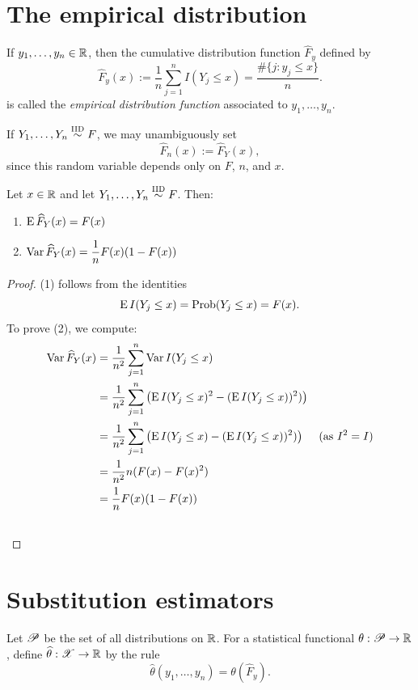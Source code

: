 \documentclass[12pt]{amsart}
\begin{document}
\section{The empirical distribution}

\begin{definition}
If $y_1,\ldots,y_n\in\mathbb{R}$,
then the cumulative distribution function $\hat F_y$ defined by
\[\hat F_y(x) := \frac1n\sum_{j=1}^n I(Y_j\leq x) = \frac{\#\{j : y_j\leq x\}}n.\]
is called the \emph{empirical distribution function}
associated to $y_1,\ldots,y_n$.
\end{definition}

If $Y_1,\ldots,Y_n\overset{\text{\textsc{IID}}}\sim F$, we may unambiguously set
\[
\hat F_n(x) := \hat F_Y(x),
\]
since this random variable depends only on $F$, $n$, and $x$.


\begin{theorem}
    Let $x\in\mathbb{R}$ and let $Y_1,\ldots,Y_n\overset{\text{\textsc{IID}}}\sim F$. Then:
    \begin{enumerate}
        \item $\operatorname{E} \widehat F_Y(x) = F(x)$
        \item $\operatorname{Var} \widehat F_Y(x) = \dfrac 1 n F(x)(1-F(x))$
    \end{enumerate}
\end{theorem}
\begin{proof}
    (1) follows from the identities
    \[\operatorname{E} I(Y_j\leq x) = \operatorname{Prob}(Y_j\leq x) = F(x).\]
    To prove (2), we compute:
    \begin{align*}
        \operatorname{Var} \widehat F_Y(x) &= \frac1{n^2} \sum_{j=1}^n \operatorname{Var} I(Y_j\leq x)\\
        &= \frac1{n^2}\sum_{j=1}^n\left(\operatorname{E} I(Y_j\leq x)^2 - (\operatorname{E} I(Y_j\leq x))^2)\right)\\
        &= \frac1{n^2}\sum_{j=1}^n\left(\operatorname{E} I(Y_j\leq x) - (\operatorname{E} I(Y_j\leq x))^2)\right)&\text{(as $I^2=I$)}\\
        &= \frac1{n^2} n(F(x) - F(x)^2)\\
        &= \frac1n F(x)(1-F(x))\\&\qedhere
    \end{align*}
\end{proof}

\section{Substitution estimators}

Let $\mathscr{P}$ be the set of all distributions on $\mathbb{R}$. For a statistical functional 
$\theta:\mathscr{P}\to\mathbb{R}$, define $\widehat\theta:\mathscr{X}\to\mathbb{R}$ by the rule
\[\hat\theta(y_1,\ldots,y_n) = \theta(\hat F_y).\]
\end{document}
